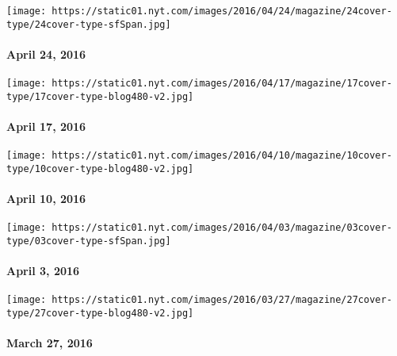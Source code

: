\href{http://www.nytimes.com/indexes/2016/04/24/magazine/index.html}{}

\texttt{[image: https://static01.nyt.com/images/2016/04/24/magazine/24cover-type/24cover-type-sfSpan.jpg]}

\hypertarget{april-24-2016}{%
\paragraph{April 24, 2016}\label{april-24-2016}}

\href{http://www.nytimes.com/indexes/2016/04/17/magazine/index.html}{}

\texttt{[image: https://static01.nyt.com/images/2016/04/17/magazine/17cover-type/17cover-type-blog480-v2.jpg]}

\hypertarget{april-17-2016}{%
\paragraph{April 17, 2016}\label{april-17-2016}}

\href{http://www.nytimes.com/indexes/2016/04/11/magazine/index.html}{}

\texttt{[image: https://static01.nyt.com/images/2016/04/10/magazine/10cover-type/10cover-type-blog480-v2.jpg]}

\hypertarget{april-10-2016}{%
\paragraph{April 10, 2016}\label{april-10-2016}}

\href{http://www.nytimes.com/indexes/2016/04/03/magazine/index.html}{}

\texttt{[image: https://static01.nyt.com/images/2016/04/03/magazine/03cover-type/03cover-type-sfSpan.jpg]}

\hypertarget{april-3-2016}{%
\paragraph{April 3, 2016}\label{april-3-2016}}

\href{http://www.nytimes.com/indexes/2016/03/27/magazine/index.html}{}

\texttt{[image: https://static01.nyt.com/images/2016/03/27/magazine/27cover-type/27cover-type-blog480-v2.jpg]}

\hypertarget{march-27-2016}{%
\paragraph{March 27, 2016}\label{march-27-2016}}

